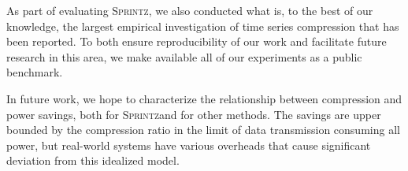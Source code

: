 \documentclass[acmlarge]{acmart}
\newcommand{\mine}{\textsc{Sprintz}}
\newcommand{\minesp}{\textsc{Sprintz}\text{ }}
\newcommand{\fire}{\textsc{Fire}\text{ }}
\begin{document}
As part of evaluating \mine, we also conducted what is, to the best of our knowledge, the largest empirical investigation of time series compression that has been reported. To both ensure reproducibility of our work and facilitate future research in this area, we make available all of our experiments as a public benchmark.

In future work, we hope to characterize the relationship between compression and power savings, both for \minesp and for other methods. The savings are upper bounded by the compression ratio in the limit of data transmission consuming all power, but real-world systems have various overheads that cause significant deviation from this idealized model.











% 




% 



\balance
\end{document}
